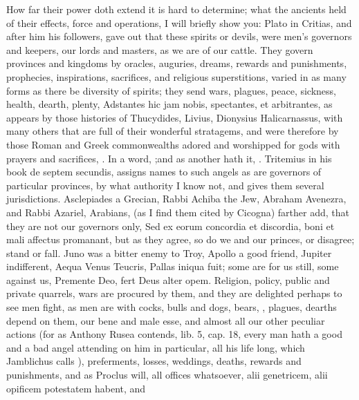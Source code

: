 {{How far their power doth extend it is hard to determine; what the
ancients held of their effects, force and operations, I will briefly
show you: Plato in Critias, and after him his followers, gave out that
these spirits or devils, were men's governors and keepers, our lords
and masters, as we are of our cattle. They govern provinces and
kingdoms by oracles, auguries, dreams, rewards and punishments,
prophecies, inspirations, sacrifices, and religious superstitions,
varied in as many forms as there be diversity of spirits; they send
wars, plagues, peace, sickness, health, dearth, plenty, Adstantes
hic jam nobis, spectantes, et arbitrantes, \etc{} as appears by those
histories of Thucydides, Livius, Dionysius Halicarnassus, with many
others that are full of their wonderful stratagems, and were therefore
by those Roman and Greek commonwealths adored and worshipped for gods
with prayers and sacrifices, \etc{}. In a word, ;and as another hath it, . Tritemius in his book de
septem secundis, assigns names to such angels as are governors of
particular provinces, by what authority I know not, and gives them
several jurisdictions. Asclepiades a Grecian, Rabbi Achiba the Jew,
Abraham Avenezra, and Rabbi Azariel, Arabians, (as I find them cited by
Cicogna) farther add, that they are not our governors only, Sed
ex eorum concordia et discordia, boni et mali affectus promanant, but
as they agree, so do we and our princes, or disagree; stand or fall.
Juno was a bitter enemy to Troy, Apollo a good friend, Jupiter
indifferent, Aequa Venus Teucris, Pallas iniqua fuit; some are for us
still, some against us, Premente Deo, fert Deus alter opem. Religion,
policy, public and private quarrels, wars are procured by them, and
they are delighted perhaps to see men fight, as men are with
cocks, bulls and dogs, bears, \etc{}, plagues, dearths depend on them, our
bene and male esse, and almost all our other peculiar actions (for as
Anthony Rusea contends, lib. 5, cap. 18, every man hath a good and a
bad angel attending on him in particular, all his life long, which
Jamblichus calls ), preferments, losses, weddings, deaths,
rewards and punishments, and as Proclus will, all offices
whatsoever, alii genetricem, alii opificem potestatem habent, \etc{} and
}}
